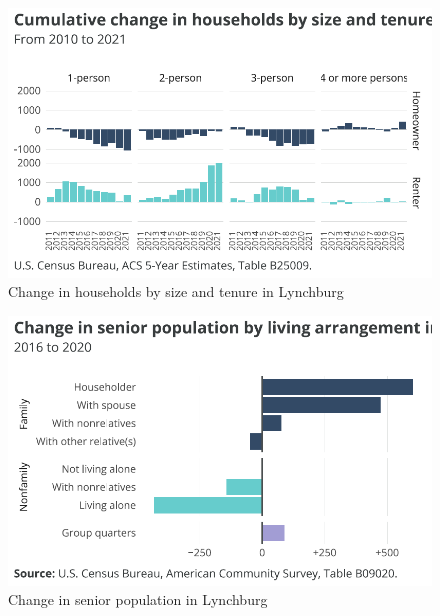 \documentclass[
  letterpaper,
  DIV=11,
  numbers=noendperiod]{scrreprt}
\begin{document}
\begin{figure}[H]

{\centering \includegraphics{./part-3-3_files/figure-pdf/figsize-1.pdf}

}

\caption{Change in households by size and tenure in Lynchburg}

\end{figure}

\begin{figure}[H]

{\centering \includegraphics{./part-3-3_files/figure-pdf/fig-senior-1.pdf}

}

\caption{\label{fig-senior}Change in senior population in Lynchburg}

\end{figure}
\end{document}
